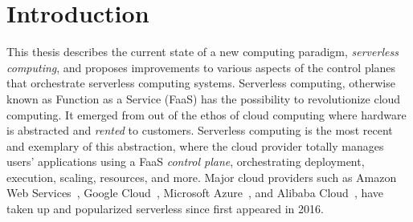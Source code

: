 \chapter{Introduction}
\label{chap:introduction}



This thesis describes the current state of a new computing paradigm, \emph{serverless computing}, and proposes improvements to various aspects of the control planes that orchestrate serverless computing systems.
Serverless computing, otherwise known as Function as a Service (FaaS) has the possibility to revolutionize cloud computing.
It emerged from out of the ethos of cloud computing where hardware is abstracted and \emph{rented} to customers.
Serverless computing is the most recent and exemplary of this abstraction, where the cloud provider totally manages users' applications using a FaaS \emph{control plane}, orchestrating deployment, execution, scaling, resources, and more.
Major cloud providers such as Amazon Web Services~\cite{lambda}, Google Cloud~\cite{gcp-functions}, Microsoft Azure~\cite{azure-functions}, and Alibaba Cloud~\cite{alibaba-compute}, have taken up and popularized serverless since first appeared in 2016.

